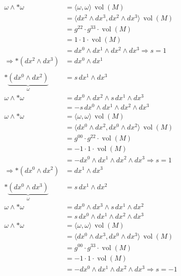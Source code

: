 \begin{align*}
	\omega \wedge \ast \omega
	&=
	\langle \omega, \omega \rangle \, \operatorname{vol}(M)
	\\
	&=
	\langle dx^2 \wedge dx^3, dx^2 \wedge dx^3 \rangle \, \operatorname{vol}(M)
	\\
	&=
	g^{22} \cdot g^{33} \cdot \operatorname{vol}(M)
	\\
	&=
	1 \cdot 1 \cdot \operatorname{vol}(M)
	\\
	&=
	dx^0 \wedge dx^1 \wedge dx^2 \wedge dx^3 \Rightarrow s = 1
	\\
	\Rightarrow \ast(dx^2 \wedge dx^3)
	&=
	dx^0 \wedge dx^1
\\
\\
	\ast \underbrace{(dx^0 \wedge dx^2)}_{\omega}
	&=
	s \, dx^1 \wedge dx^3
	\\
	\omega \wedge \ast \omega
	&=
	dx^0 \wedge dx^2 \wedge s \, dx^1 \wedge dx^3
	\\
	&=
	-s \, dx^0 \wedge dx^1 \wedge dx^2 \wedge dx^3
	\\
	\omega \wedge \ast \omega
	&=
	\langle \omega, \omega \rangle \, \operatorname{vol}(M)
	\\
	&=
	\langle dx^0 \wedge dx^2, dx^0 \wedge dx^2 \rangle \, \operatorname{vol}(M)
	\\
	&=
	g^{00} \cdot g^{22} \cdot \operatorname{vol}(M)
	\\
	&=
	-1 \cdot 1 \cdot \operatorname{vol}(M)
	\\
	&=
	-dx^0 \wedge dx^1 \wedge dx^2 \wedge dx^3 \Rightarrow s = 1
	\\
	\Rightarrow \ast(dx^0 \wedge dx^2)
	&=
	dx^1 \wedge dx^3
\\
\\
	\ast \underbrace{(dx^0 \wedge dx^3)}_{\omega}
	&=
	s \, dx^1 \wedge dx^2
	\\
	\omega \wedge \ast \omega
	&=
	dx^0 \wedge dx^3 \wedge s \, dx^1 \wedge dx^2
	\\
	&=
	s \, dx^0 \wedge dx^1 \wedge dx^2 \wedge dx^3
	\\
	\omega \wedge \ast \omega
	&=
	\langle \omega, \omega \rangle \, \operatorname{vol}(M)
	\\
	&=
	\langle dx^0 \wedge dx^3, dx^0 \wedge dx^3 \rangle \, \operatorname{vol}(M)
	\\
	&=
	g^{00} \cdot g^{33} \cdot \operatorname{vol}(M)
	\\
	&=
	-1 \cdot 1 \cdot \operatorname{vol}(M)
	\\
	&=
	-dx^0 \wedge dx^1 \wedge dx^2 \wedge dx^3 \Rightarrow s = -1
	\\

\end{align*}
